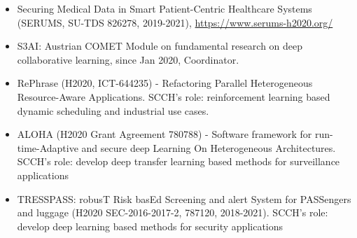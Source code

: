 \documentclass[a4paper,11pt]{article}
\begin{document}
\begin{itemize}
\item Securing Medical Data in Smart Patient-Centric Healthcare Systems (SERUMS, SU-TDS 826278, 2019-2021),  \url{https://www.serums-h2020.org/}



\item S3AI: Austrian COMET Module on fundamental research on deep collaborative learning, since Jan 2020, Coordinator. 

\item RePhrase (H2020, ICT-644235) - Refactoring Parallel Heterogeneous Resource-Aware Applications. SCCH's role: reinforcement learning based dynamic scheduling and industrial use cases.



\item ALOHA (H2020 Grant Agreement 780788) - Software framework for run-time-Adaptive and secure deep Learning On Heterogeneous Architectures. SCCH's role: develop deep transfer learning based methods for surveillance applications

\item TRESSPASS: robusT Risk basEd Screening and alert System for PASSengers and luggage (H2020 SEC-2016-2017-2, 787120, 2018-2021). SCCH's role: develop deep learning based methods for security applications




\end{itemize}
\end{document}
